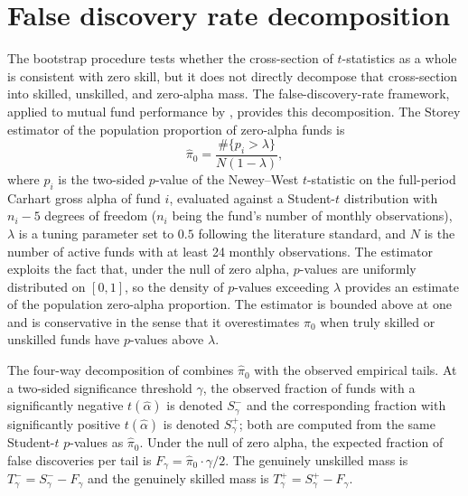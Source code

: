 \documentclass[12pt, oneside]{report}
\begin{document}
\section{False discovery rate decomposition}
\label{sec:fdr_methodology}

\noindent The bootstrap procedure tests whether the cross-section of
$t$-statistics as a whole is consistent with zero skill, but it does not
directly decompose that cross-section into skilled, unskilled, and
zero-alpha mass. The \textcite{Storey2002} false-discovery-rate framework,
applied to mutual fund performance by
\textcite{BarrasScailletWermers2010}, provides this decomposition. The
Storey estimator of the population proportion of zero-alpha funds is
\begin{equation}
\hat{\pi}_0 = \frac{\#\{p_i > \lambda\}}{N (1 - \lambda)},
\label{eq:storey}
\end{equation}
where $p_i$ is the two-sided $p$-value of the Newey--West $t$-statistic
on the full-period Carhart gross alpha of fund $i$, evaluated against a
Student-$t$ distribution with $n_i - 5$ degrees of freedom ($n_i$ being
the fund's number of monthly observations), $\lambda$ is a tuning
parameter set to $0.5$ following the literature standard, and $N$ is the
number of active funds with at least 24 monthly observations. The
estimator exploits the fact that, under the null of zero alpha,
$p$-values are uniformly distributed on $[0, 1]$, so the density of
$p$-values exceeding $\lambda$ provides an estimate of the population
zero-alpha proportion. The estimator is bounded above at one and is
conservative in the sense that it overestimates $\pi_0$ when truly
skilled or unskilled funds have $p$-values above $\lambda$.

The four-way decomposition of \textcite{BarrasScailletWermers2010}
combines $\hat{\pi}_0$ with the observed empirical tails. At a two-sided
significance threshold $\gamma$, the observed fraction of funds with a
significantly negative $t(\hat{\alpha})$ is denoted $S^-_\gamma$ and
the corresponding fraction with significantly positive
$t(\hat{\alpha})$ is denoted $S^+_\gamma$; both are computed from the
same Student-$t$ $p$-values as $\hat{\pi}_0$. Under the null of zero
alpha, the expected fraction of false discoveries per tail is
$F_\gamma = \hat{\pi}_0 \cdot \gamma / 2$. The genuinely unskilled mass
is $T^-_\gamma = S^-_\gamma - F_\gamma$ and the genuinely skilled mass
is $T^+_\gamma = S^+_\gamma - F_\gamma$.
\end{document}
